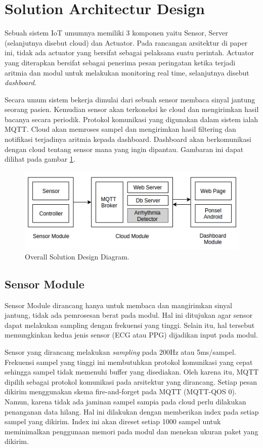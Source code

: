 \documentclass[]{indojc}
\begin{document}
\section{Solution Architectur Design}
Sebuah sistem IoT umumnya memiliki 3 komponen yaitu Sensor, Server (selanjutnya disebut cloud) dan Actuator. Pada rancangan arsitektur di paper ini, tidak ada actuator yang bersifat sebagai pelaksana suatu perintah. Actuator yang diterapkan bersifat sebagai penerima pesan peringatan ketika terjadi aritmia dan modul untuk melakukan monitoring real time, selanjutnya disebut \textit{dashboard}.

Secara umum sistem bekerja dimulai dari sebuah sensor membaca sinyal jantung seorang pasien. Kemudian sensor akan terkoneksi ke cloud dan mengirimkan hasil bacanya secara periodik. Protokol komunikasi yang digunakan dalam sistem ialah MQTT. Cloud akan memroses sampel dan mengirimkan hasil filtering dan notifikasi terjadinya aritmia kepada dashboard. Dashboard akan berkomunikasi dengan cloud tentang sensor mana yang ingin dipantau. Gambaran ini dapat dilihat pada gambar \ref{fig:overall_diagram}.

\begin{figure}[htbp]
\centerline{\includegraphics[scale=0.5]{images/overall.png}}
\caption{Overall Solution Design Diagram.}
\label{fig:overall_diagram}
\end{figure}

\subsection{Sensor Module}
Sensor Module dirancang hanya untuk membaca dan mangirimkan sinyal jantung, tidak ada pemrosesan berat pada modul. Hal ini ditujukan agar sensor dapat melakukan sampling dengan frekuensi yang tinggi. Selain itu, hal tersebut memungkinkan kedua jenis sensor (ECG atau PPG) dijadikan input pada modul. 

Sensor yang dirancang melakukan \textit{sampling} pada 200Hz atau 5ms/sampel. Frekuensi sampel yang tinggi ini membutuhkan protokol komunikasi yang cepat sehingga sampel tidak memenuhi buffer yang disediakan. Oleh karena itu, MQTT dipilih sebagai protokol komunikasi pada arsitektur yang dirancang. Setiap pesan dikirim menggunakan skema fire-and-forget pada MQTT (MQTT-QOS 0). Namun, karena tidak ada jaminan sampel sampia pada cloud perlu dilakukan penanganan data hilang. Hal ini dilakukan dengan memberikan index pada setiap sampel yang dikirim. Index ini akan direset setiap 1000 sampel untuk meminimalkan penggunaan memori pada modul dan menekan ukuran paket yang dikirim.
\end{document}
